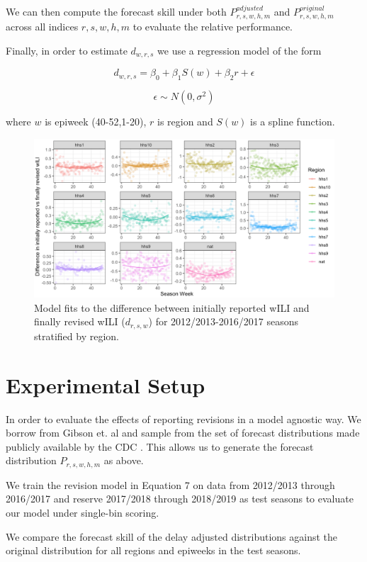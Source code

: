\documentclass{umassthesis}          %
\begin{document}
We can then compute the forecast skill under both $P_{r,s,w,h,m}^{adjusted}$ and $P_{r,s,w,h,m}^{original}$ across all indices $r,s,w,h,m$ to evaluate the relative performance. 

Finally, in order to estimate $d_{w,r,s}$ we use a regression model of the form


\begin{equation}
    d_{w,r,s} = \beta_0 +\beta_1 S(w) + \beta_2 r + \epsilon 
\end{equation} 

    $$\epsilon \sim N(0,\sigma^2)$$

where $w$ is epiweek (40-52,1-20), $r$ is region and $S(w)$ is a spline function. 

\begin{figure}
    \centering
    \includegraphics[scale=.35]{model_fit.png}
    \caption{Model fits to the difference between initially reported wILI and finally revised wILI ($d_{r,s,w}$) for 2012/2013-2016/2017 seasons stratified by region. }
    \label{fig:my_label}
\end{figure}
\section{Experimental Setup}

In order to evaluate the effects of reporting revisions in a model agnostic way. We borrow from Gibson et. al and sample from the set of forecast distributions made publicly available by the CDC \cite{cdcfluepi}. This allows us to generate the forecast distribution $P_{r,s,w,h,m}$ as above. 

We train the revision model in Equation 7 on data from 2012/2013 through 2016/2017 and reserve 2017/2018 through 2018/2019 as test seasons to evaluate our model under single-bin scoring. 

We compare the forecast skill of the delay adjusted distributions against the original distribution for all regions and epiweeks in the test seasons.
\end{document}
